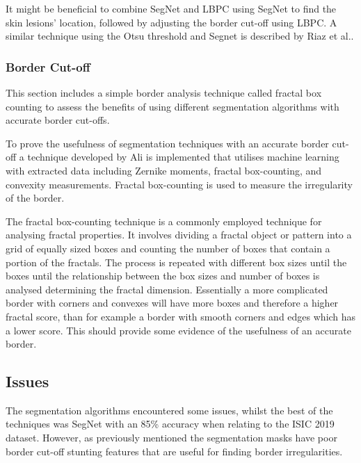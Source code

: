 It might be beneficial to combine SegNet and LBPC using SegNet to find the skin lesions' location, followed by adjusting the border cut-off using LBPC. A similar technique using the Otsu threshold and Segnet is described by Riaz et al.\cite{Riaz2019}.


\subsubsection{Border Cut-off}
This section includes a simple border analysis technique called fractal box counting to assess the benefits of using different segmentation algorithms with accurate border cut-offs.

To prove the usefulness of segmentation techniques with an accurate border cut-off a technique developed by Ali\cite{Ali2020b} is implemented that utilises machine learning with extracted data including Zernike moments, fractal box-counting, and convexity measurements. Fractal box-counting is used to measure the irregularity of the border.

The fractal box-counting technique is a commonly employed technique for analysing fractal properties. It involves dividing a fractal object or pattern into a grid of equally sized boxes and counting the number of boxes that contain a portion of the fractals. The process is repeated with different box sizes until the boxes until the relationship between the box sizes and number of boxes is analysed determining the fractal dimension\cite{Hamburger1996}. Essentially a more complicated border with corners and convexes will have more boxes and therefore a higher fractal score, than for example a border with smooth corners and edges which has a lower score. This should provide some evidence of the usefulness of an accurate border.

\subsection{Issues}
The segmentation algorithms encountered some issues, whilst the best of the techniques was SegNet with an 85\% accuracy when relating to the ISIC 2019 dataset. However, as previously mentioned the segmentation masks have poor border cut-off stunting features that are useful for finding border irregularities. 

